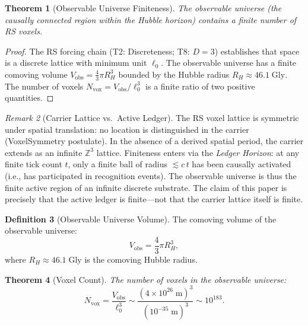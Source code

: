 \documentclass[12pt,a4paper]{article}
\newtheorem{theorem}{Theorem}[section]
\theoremstyle{definition}
\newtheorem{definition}[theorem]{Definition}
\theoremstyle{remark}
\newtheorem{remark}[theorem]{Remark}
\begin{document}
\begin{theorem}[Observable Universe Finiteness]
\label{thm:spatial}
The observable universe (the causally connected region within the
Hubble horizon) contains a finite number of RS voxels.
\end{theorem}

\begin{proof}
The RS forcing chain (T2: Discreteness; T8: $D=3$) establishes that
space is a discrete lattice with minimum unit $\ell_0$.  The
observable universe has a finite comoving volume
$V_{\mathrm{obs}} = \tfrac{4}{3}\pi R_H^3$ bounded by the Hubble
radius $R_H \approx 46.1\;\mathrm{Gly}$.  The number of voxels
$N_{\mathrm{vox}} = V_{\mathrm{obs}} / \ell_0^3$ is a finite ratio
of two positive quantities.
\end{proof}

\begin{remark}[Carrier Lattice vs.\ Active Ledger]
\label{rem:infinite-carrier}
The RS voxel lattice is symmetric under spatial translation: no
location is distinguished in the carrier (VoxelSymmetry postulate).
In the absence of a derived spatial period, the carrier extends as
an infinite $\mathbb{Z}^3$ lattice.  Finiteness enters via the
\emph{Ledger Horizon}: at any finite tick count $t$, only a
finite ball of radius $\lesssim c\,t$ has been causally activated
(i.e., has participated in recognition events).  The observable
universe is thus the finite active region of an infinite discrete
substrate.  The claim of this paper is precisely that the active
ledger is finite---not that the carrier lattice itself is finite.
\end{remark}

\begin{definition}[Observable Universe Volume]
The comoving volume of the observable universe:
\begin{equation}
  V_{\mathrm{obs}} = \frac{4}{3}\pi R_H^3,
\end{equation}
where $R_H \approx 46.1\;\mathrm{Gly}$ is the comoving Hubble
radius.
\end{definition}

\begin{theorem}[Voxel Count]
The number of voxels in the observable universe:
\begin{equation}
  N_{\mathrm{vox}} = \frac{V_{\mathrm{obs}}}{\ell_0^3}
  \sim \frac{(4 \times 10^{26}\;\mathrm{m})^3}
  {(10^{-35}\;\mathrm{m})^3} \sim 10^{183}.
\end{equation}
\end{theorem}
\end{document}
